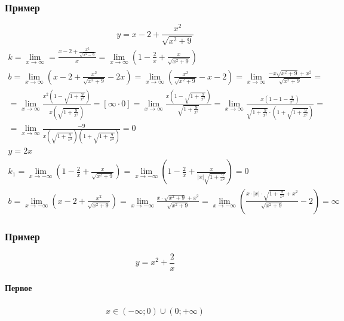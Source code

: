 \documentclass{article}
\begin{document}
\subsubsection{Пример}
\[
    y = x - 2 + \frac{x^2}{\sqrt{x^2 + 9}}
\]
\begin{gather*}
    k = \lim_{x \to \infty} = \frac{x - 2 + \frac{x^2}{\sqrt{x^2 - 9}}}{x} =
    \lim_{x \to \infty} \left( 1 - \frac{2}{x} + \frac{x}{\sqrt{x^2 + 9}} \right) \\
    b = \lim_{x \to \infty} \left( x - 2 + \frac{x^2}{\sqrt{x^2 + 9}} - 2x \right) =
    \lim_{x \to \infty} \left(\frac{x^2}{\sqrt{x^2 + 9}} - x - 2 \right) =
    \lim_{x \to \infty} \frac{-x \sqrt{x^2 + 9} + x^2}{\sqrt{x^2 + 9}} = \\
    = \lim_{x \to \infty} \frac{x^2 \left( 1 - \sqrt{1 + \frac{9}{x^2}} \right)}{x \left( \sqrt{1 + \frac{9}{x^2}} \right)} =
    \left[ \infty \cdot 0 \right] =
    \lim_{x \to \infty }\frac{x \left( 1 - \sqrt{1 + \frac{9}{x^2}} \right)}{\sqrt{1 + \frac{9}{x^2}}} =
    \lim_{x \to \infty} \frac{x \left( 1 - 1 - \frac{9}{x^2} \right)}{\sqrt{1 + \frac{9}{x^2}} \cdot \left( 1 + \sqrt{1 + \frac{9}{x^2}} \right)} = \\
    = \lim_{x \to \infty} \frac{-9}{x \left( \sqrt{1 + \frac{9}{x^2}} \right) \left( 1 + \sqrt{1 + \frac{9}{x^2}} \right)} = 0 \\
    y = 2x \\
    k_1 = \lim_{x \to -\infty} \left( 1 - \frac{2}{x} + \frac{x}{\sqrt{x^2 + 9}} \right) =
    \lim_{x \to -\infty} \left( 1 - \frac{2}{x} + \frac{x}{|x| \sqrt{1 + \frac{9}{x^2}}} \right) = 0 \\
    b = \lim_{x \to -\infty} \left( x - 2 + \frac{x^2}{\sqrt{x^2 + 9}} \right) =
    \lim_{x \to -\infty} \frac{x \cdot \sqrt{x^2 + 9} + x^2}{\sqrt{x^2 + 9}} =
    \lim_{x \to -\infty} \left( \frac{x \cdot |x| \cdot \sqrt{1 + \frac{9}{x^2}} + x^2}{\sqrt{x^2 + 9}} - 2 \right) = \infty
\end{gather*}

\subsubsection{Пример}
\[
    y = x^2 + \frac{2}{x}
\]
\paragraph{Первое}
\begin{gather*}
    x \in (-\infty; 0) \cup (0; +\infty)
\end{gather*}
\end{document}
